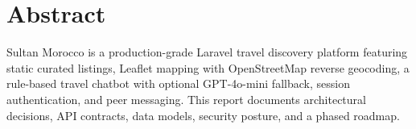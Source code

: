 \chapter*{Abstract}

Sultan Morocco is a production-grade Laravel travel discovery platform featuring static curated listings, Leaflet mapping with OpenStreetMap reverse geocoding, a rule-based travel chatbot with optional GPT-4o-mini fallback, session authentication, and peer messaging. This report documents architectural decisions, API contracts, data models, security posture, and a phased roadmap.

\tableofcontents
\listoffigures
\listoftables
\cleardoublepage
{}
